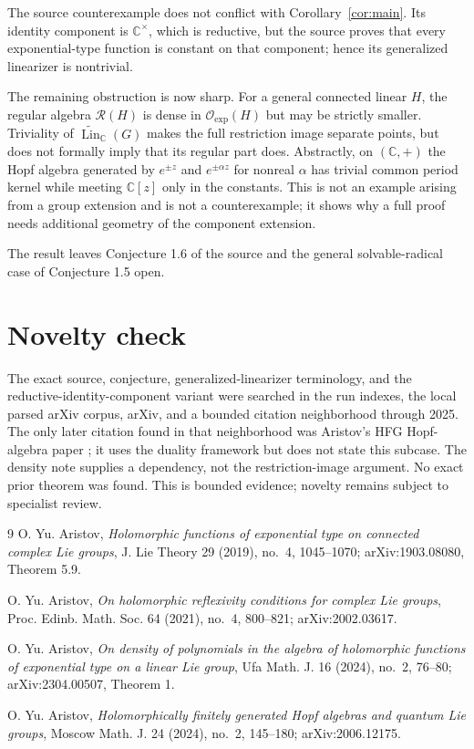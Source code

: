 \documentclass[11pt]{article}
\newcommand{\Oexp}{\mathcal O_{\mathrm{exp}}}
\newcommand{\Reg}{\mathcal R}
\newcommand{\LinB}{\widetilde{\operatorname{Lin}}_{\mathbb C}}
\begin{document}
The source counterexample does not conflict with Corollary~\ref{cor:main}.
Its identity component is $\mathbb C^\times$, which is reductive, but the
source proves that every exponential-type function is constant on that
component; hence its generalized linearizer is nontrivial.

The remaining obstruction is now sharp.  For a general connected linear
$H$, the regular algebra $\Reg(H)$ is dense in $\Oexp(H)$ but may be strictly
smaller.  Triviality of $\LinB(G)$ makes the full restriction image separate
points, but does not formally imply that its regular part does.  Abstractly,
on $(\mathbb C,+)$ the Hopf algebra generated by
$e^{\pm z}$ and $e^{\pm\alpha z}$ for nonreal $\alpha$ has trivial common
period kernel while meeting $\mathbb C[z]$ only in the constants.  This is
not an example arising from a group extension and is not a counterexample;
it shows why a full proof needs additional geometry of the component
extension.

The result leaves Conjecture 1.6 of the source and the general solvable-radical
case of Conjecture 1.5 open.

\section{Novelty check}

The exact source, conjecture, generalized-linearizer terminology, and the
reductive-identity-component variant were searched in the run indexes, the
local parsed arXiv corpus, arXiv, and a bounded citation neighborhood through
2025.  The only later citation found in that neighborhood was Aristov's HFG
Hopf-algebra paper \cite{Ar24}; it uses the duality framework but does not
state this subcase.  The density note \cite{Ar23} supplies a dependency, not
the restriction-image argument.  No exact prior theorem was found.  This is
bounded evidence; novelty remains subject to specialist review.

\begin{thebibliography}{9}
O. Yu. Aristov,
\emph{Holomorphic functions of exponential type on connected complex Lie
groups}, J. Lie Theory 29 (2019), no.~4, 1045--1070;
arXiv:1903.08080, Theorem 5.9.

O. Yu. Aristov,
\emph{On holomorphic reflexivity conditions for complex Lie groups},
Proc. Edinb. Math. Soc. 64 (2021), no.~4, 800--821;
arXiv:2002.03617.

O. Yu. Aristov,
\emph{On density of polynomials in the algebra of holomorphic functions of
exponential type on a linear Lie group}, Ufa Math. J. 16 (2024), no.~2,
76--80; arXiv:2304.00507, Theorem 1.

O. Yu. Aristov,
\emph{Holomorphically finitely generated Hopf algebras and quantum Lie
groups}, Moscow Math. J. 24 (2024), no.~2, 145--180;
arXiv:2006.12175.
\end{thebibliography}
\end{document}
